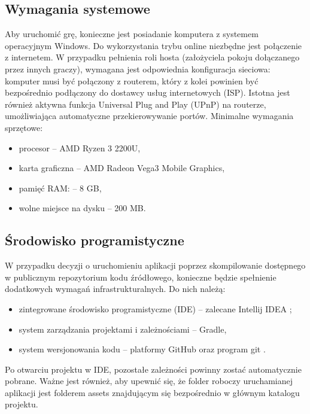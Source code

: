 \subsection{Wymagania systemowe}
Aby uruchomić grę, konieczne jest posiadanie komputera z systemem operacyjnym Windows. Do wykorzystania trybu online niezbędne jest połączenie z internetem. W przypadku pełnienia roli hosta (założyciela pokoju dołączanego przez innych graczy), wymagana jest odpowiednia konfiguracja sieciowa: komputer musi być połączony z routerem, który z kolei powinien być bezpośrednio podłączony do dostawcy usług internetowych (ISP). Istotna jest również aktywna funkcja Universal Plug and Play (UPnP) na routerze, umożliwiająca automatyczne przekierowywanie portów. Minimalne wymagania sprzętowe:
\begin{itemize}
\item procesor -- AMD Ryzen 3 2200U,
\item karta graficzna -- AMD Radeon Vega3 Mobile Graphics,
\item pamięć RAM: -- 8 GB,
\item wolne miejsce na dysku -- 200 MB.
\end{itemize}

\subsection{Środowisko programistyczne}
W przypadku decyzji o uruchomieniu aplikacji poprzez skompilowanie dostępnego w publicznym repozytorium kodu źródłowego, konieczne będzie spełnienie dodatkowych wymagań infrastrukturalnych. Do nich należą:
\begin{itemize}
\item zintegrowane środowisko programistyczne (IDE) -- zalecane Intellij IDEA \cite{IntellijIDEA}; 
\item system zarządzania projektami i zależnościami -- Gradle,
\item system wersjonowania kodu -- platformy GitHub \cite{GitHub} oraz program git \cite{Git}.
\end{itemize}
Po otwarciu projektu w IDE, pozostałe zależności powinny zostać automatycznie pobrane. Ważne jest również, aby upewnić się, że folder roboczy uruchamianej aplikacji jest folderem assets znajdującym się bezpośrednio w głównym katalogu projektu.

